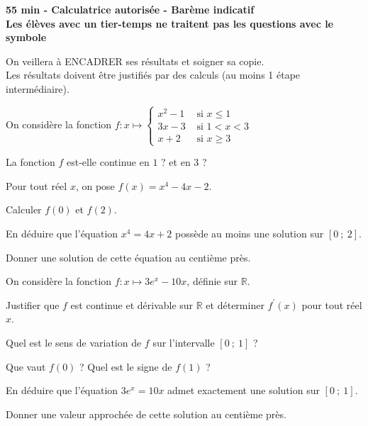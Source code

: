 \documentclass[11pt,a4paper]{article}  %
\begin{document}
	\graphicspath{{images/}}

	\begin{center}

	\end{center}
	\begin{center}\textbf{55 min - Calculatrice autorisée - Barème indicatif}\\
		\textbf{Les élèves avec un tier-temps ne traitent pas les questions avec  le symbole }
	\end{center}

	\begin{center}
		On veillera à ENCADRER ses résultats et soigner sa copie.\\
		Les résultats doivent être justifiés par des calculs (au moins 1 étape intermédiaire).
	\end{center}


On considère la fonction $f: x \mapsto \begin{cases}x^2-1 & \text { si } x \leqslant 1 \\ 3x-3 & \text { si } 1<x<3  \\ x+2 & \text { si } x \geqslant 3\end{cases}$

La fonction $f$ est-elle continue en $1$ ? et en $3$ ?


Pour tout réel $x$, on pose $f(x)=x^4-4x-2$.
\begin{enumMet}
	\item {} Calculer $f(0)$ et $f(2)$.
	\item {} En déduire que l'équation $x^4=4x+2$ possède au moins une solution sur $[0\ ;\ 2]$.
	\item {} Donner une solution de cette équation au centième près.
\end{enumMet}


On considère la fonction $f: x \mapsto 3e^x-10x$, définie sur $\mathbb{R}$.
\begin{enumMet}
	\item Justifier que $f$ est continue et dérivable sur $\mathbb{R}$ et déterminer $f^{\prime}(x)$ pour tout réel $x$.
	\item Quel est le sens de variation de $f$ sur l'intervalle $[0\ ;\ 1]$ ?
	\item Que vaut $f(0)$ ? Quel est le signe de $f(1)$ ?
	\item En déduire que l'équation $3e^x=10x$ admet exactement une solution sur $[0\ ;\ 1]$.
	\item Donner une valeur approchée de cette solution au centième près.
\end{enumMet}
\end{document}
